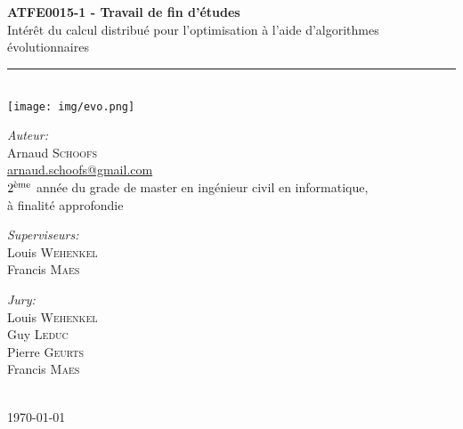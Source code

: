 \documentclass[a4paper, 11pt]{report}
\newcommand{\HRule}{\rule{\linewidth}{0.5mm}}
\begin{document}
\begin{titlepage}

\begin{center}

\begin{figure}
\centering
\mbox{
\hspace{6cm}
}
\end{figure}

\ \\[1cm]

\textbf{\large ATFE0015-1 - Travail de fin d'études}\\[1,5cm]




\huge Intérêt du calcul distribué pour l'optimisation à l'aide d'algorithmes évolutionnaires
\HRule \\[0.4cm]
\texttt{[image: img/evo.png]}


\vfill

\large
\emph{Auteur:}\\
Arnaud \textsc{Schoofs}\\
\href{mailto:arnaud.schoofs@gmail.com}{arnaud.schoofs@gmail.com}\\
\large $2^{\textnormal{ème}}$ année du grade de master en ingénieur civil en informatique,\\
à finalité approfondie \\[1cm]

\begin{minipage}{0.4\textwidth}
\begin{flushleft} \large
\emph{Superviseurs:}\\
Louis \textsc{Wehenkel}\\
Francis \textsc{Maes}
\end{flushleft}
\end{minipage}
\begin{minipage}{0.4\textwidth}
\begin{flushright} \large
\emph{Jury:} \\
Louis \textsc{Wehenkel}\\
Guy \textsc{Leduc}\\
Pierre \textsc{Geurts}\\
Francis \textsc{Maes}
\end{flushright}
\end{minipage}

\ \\[1cm]

{\large \today}

\end{center}
\end{titlepage}
\end{document}
